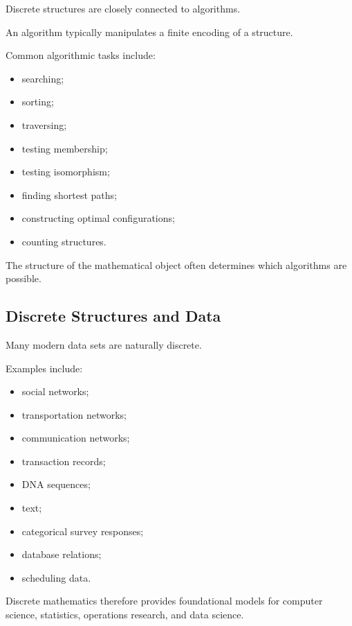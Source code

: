 Discrete structures are closely connected to algorithms.

An algorithm typically manipulates a finite encoding of a structure.

Common algorithmic tasks include:

\begin{itemize}
    \item searching;
    \item sorting;
    \item traversing;
    \item testing membership;
    \item testing isomorphism;
    \item finding shortest paths;
    \item constructing optimal configurations;
    \item counting structures.
\end{itemize}

The structure of the mathematical object often determines which
algorithms are possible.

\subsection{Discrete Structures and Data}
\label{subsec:discrete-structures-data}

Many modern data sets are naturally discrete.

Examples include:

\begin{itemize}
    \item social networks;
    \item transportation networks;
    \item communication networks;
    \item transaction records;
    \item DNA sequences;
    \item text;
    \item categorical survey responses;
    \item database relations;
    \item scheduling data.
\end{itemize}

Discrete mathematics therefore provides foundational models for
computer science, statistics, operations research, and data science.

